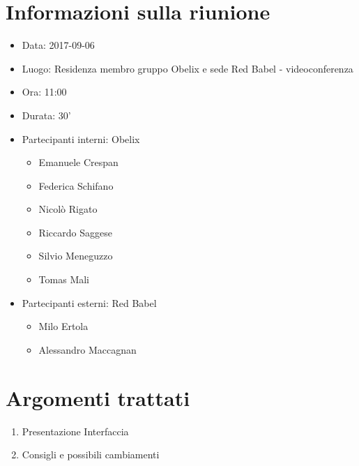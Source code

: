 \documentclass[10 pt,a4paper, openany]{article}
\date{}
\begin{document}
\paginatitolo
\section{Informazioni sulla riunione}

\begin{itemize}
\item[] Data: 2017-09-06
\item[] Luogo: Residenza membro gruppo Obelix e sede Red Babel - videoconferenza
\item[] Ora: 11:00
\item[] Durata: 30'
\item[] Partecipanti interni: Obelix
  \begin{itemize}
  \item[] Emanuele Crespan
  \item[] Federica Schifano
  \item[] Nicolò Rigato
  \item[] Riccardo Saggese
  \item[] Silvio Meneguzzo
  \item[] Tomas Mali
  \end{itemize}
\item[] Partecipanti esterni: Red Babel
  \begin{itemize}
  \item[] Milo Ertola
  \item[] Alessandro Maccagnan
  \end{itemize}
\end{itemize}

\section{Argomenti trattati}

\begin{enumerate}
	\item Presentazione Interfaccia 
	\item Consigli e possibili cambiamenti
\end{enumerate}

	\clearpage
\end{document}
